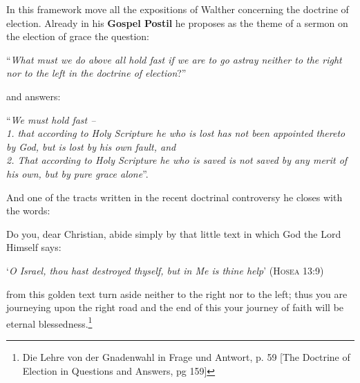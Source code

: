                 In this framework move all the expositions of Walther concerning the doctrine of election.  Already in his \textbf{Gospel Postil} he proposes as the theme of a sermon on the election of grace the question: \begin{displayquote}“\textit{What must we do above all hold fast if we are to go astray neither to the right nor to the left in the doctrine of election}?”\end{displayquote} and answers: \begin{displayquote}“\textit{We must hold fast --\\ 1. that according to Holy Scripture he who is lost has not been appointed thereto by God, but is lost by his own fault, and\\ 2. That according to Holy Scripture he who is saved is not saved by any merit of his own, but by pure grace alone}”.\end{displayquote}  And one of the tracts written in the recent doctrinal controversy he closes with the words: \begin{fancyquotes}Do you, dear Christian, abide simply by that little text in which God the Lord Himself says: \begin{displayquote} ‘\textit{O Israel, thou hast destroyed thyself, but in Me is thine help}’ {\scriptsize\textsc{(Hosea 13:9)}}\end{displayquote} from this golden text turn aside neither to the right nor to the left; thus you are journeying upon the right road and the end of this your journey of faith will be eternal blessedness.\footnote{Die Lehre von der Gnadenwahl in Frage und Antwort, p. 59 [The Doctrine of Election in Questions and Answers, pg 159]}\end{fancyquotes}

